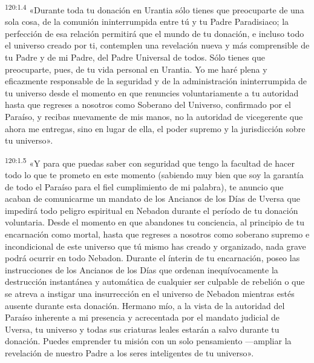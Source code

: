 \par 
\textsuperscript{120:1.4} «Durante toda tu donación en Urantia sólo tienes que preocuparte de una sola cosa, de la comunión ininterrumpida entre tú y tu Padre Paradisiaco; la perfección de esa relación permitirá que el mundo de tu donación, e incluso todo el universo creado por ti, contemplen una revelación nueva y más comprensible de tu Padre y de mi Padre, del Padre Universal de todos. Sólo tienes que preocuparte, pues, de tu vida personal en Urantia. Yo me haré plena y eficazmente responsable de la seguridad y de la administración ininterrumpida de tu universo desde el momento en que renuncies voluntariamente a tu autoridad hasta que regreses a nosotros como Soberano del Universo, confirmado por el Paraíso, y recibas nuevamente de mis manos, no la autoridad de vicegerente que ahora me entregas, sino en lugar de ella, el poder supremo y la jurisdicción sobre tu universo».

\par 
\textsuperscript{120:1.5} «Y para que puedas saber con seguridad que tengo la facultad de hacer todo lo que te prometo en este momento (sabiendo muy bien que soy la garantía de todo el Paraíso para el fiel cumplimiento de mi palabra), te anuncio que acaban de comunicarme un mandato de los Ancianos de los Días de Uversa que impedirá todo peligro espiritual en Nebadon durante el período de tu donación voluntaria. Desde el momento en que abandones tu conciencia, al principio de tu encarnación como mortal, hasta que regreses a nosotros como soberano supremo e incondicional de este universo que tú mismo has creado y organizado, nada grave podrá ocurrir en todo Nebadon. Durante el ínterin de tu encarnación, poseo las instrucciones de los Ancianos de los Días que ordenan inequívocamente la destrucción instantánea y automática de cualquier ser culpable de rebelión o que se atreva a instigar una insurrección en el universo de Nebadon mientras estés ausente durante esta donación. Hermano mío, a la vista de la autoridad del Paraíso inherente a mi presencia y acrecentada por el mandato judicial de Uversa, tu universo y todas sus criaturas leales estarán a salvo durante tu donación. Puedes emprender tu misión con un solo pensamiento ---ampliar la revelación de nuestro Padre a los seres inteligentes de tu universo».

